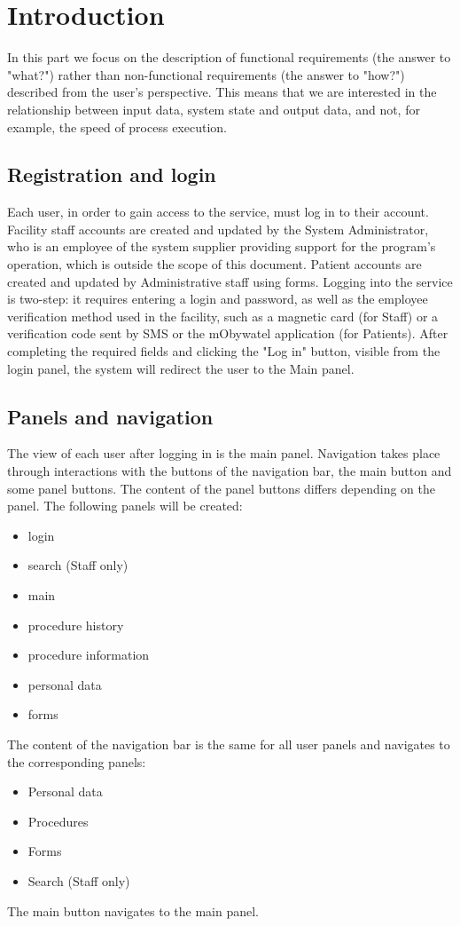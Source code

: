\label{chapter:functionalities}

\section{Introduction}
In this part we focus on the description of functional requirements (the answer to "what?") rather than non-functional requirements (the answer to "how?") described from the user's perspective. This means that we are interested in the relationship between input data, system state and output data, and not, for example, the speed of process execution.

\subsection{Registration and login}
Each user, in order to gain access to the service, must log in to their account. Facility staff accounts are created and updated by the System Administrator, who is an employee of the system supplier providing support for the program's operation, which is outside the scope of this document. Patient accounts are created and updated by Administrative staff using forms. Logging into the service is two-step: it requires entering a login and password, as well as the employee verification method used in the facility, such as a magnetic card (for Staff) or a verification code sent by SMS or the mObywatel application (for Patients). After completing the required fields and clicking the "Log in" button, visible from the login panel, the system will redirect the user to the Main panel.

\subsection{Panels and navigation}
The view of each user after logging in is the main panel. Navigation takes place through interactions with the buttons of the navigation bar, the main button and some panel buttons.
The content of the panel buttons differs depending on the panel. The following panels will be created:\begin{itemize}
    \item login
    \item search (Staff only)
    \item main
    \item procedure history
    \item procedure information
    \item personal data
    \item forms
\end{itemize}
The content of the navigation bar is the same for all user panels and navigates to the corresponding panels:\begin{itemize}
    \item Personal data
    \item Procedures
    \item Forms
    \item Search (Staff only)
\end{itemize}
The main button navigates to the main panel.

